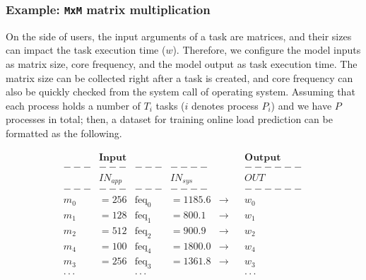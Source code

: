 \subsubsection{Example: \texttt{MxM} matrix multiplication}
\label{subsubsec:mxm-online-prediction}

On the side of users, the input arguments of a task are matrices, and their sizes can impact the task execution time ($w$). Therefore, we configure the model inputs as matrix size, core frequency, and the model output as task execution time. The matrix size can be collected right after a task is created, and core frequency can also be quickly checked from the system call of operating system. Assuming that each process holds a number of $T_{i}$ tasks ($i$ denotes process $P_{i}$) and we have $P$ processes in total; then, a dataset for training online load prediction can be formatted as the following.

{\small
\begin{align*}
&\textbf{Input}	&	&	&	&	&\textbf{Output} \\
   ---&---		&                ---&----				&									&		&------	\\
	&IN_{app}   &                &IN_{sys}      &                 &   &OUT    \\
   ---&---		&                ---&----				&									&		&------	\\
m_{0} &= 256	&		\text{feq}_{0}	&= 1185.6		&		\rightarrow		&		&w_{0}	\\
m_{1} &= 128	&		\text{feq}_{1}	&=  800.1		&		\rightarrow		&		&w_{1}	\\
m_{2}	&= 512	&		\text{feq}_{2}	&=  900.9		&		\rightarrow		&		&w_{2}	\\
m_{4}	&= 100	&		\text{feq}_{4}	&= 1800.0		&		\rightarrow		&		&w_{4}	\\
m_{3}	&= 256	&		\text{feq}_{3}	&= 1361.8		&		\rightarrow		&		&w_{3}	\\
\cdot\cdot\cdot & & \cdot\cdot\cdot & & & &  \cdot\cdot\cdot 
\end{align*}
}%


